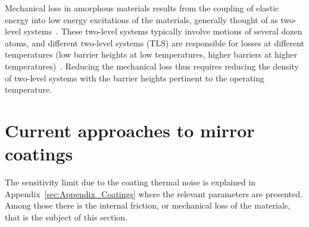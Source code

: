 Mechanical loss in amorphous materials results from the coupling of elastic energy into low energy excitations of the materials, generally thought of as two-level systems~\cite{braginsky1985systems,bommel1956dislocations}.
These two-level systems typically involve motions of several dozen atoms, and different two-level systems (TLS) are responsible for losses at different temperatures (low barrier heights at low temperatures, higher barriers at higher temperatures)~\cite{hamdan2014molecular,trinastic2016molecular}. Reducing the mechanical loss thus requires reducing the density of two-level systems with the barrier heights pertinent to the operating temperature. 


\section{Current approaches to  mirror coatings}

The sensitivity limit due to the coating thermal noise is explained  in Appendix~\ref{sec:Appendix_Coatings} where the relevant parameters are presented. Among those there is the internal friction, or mechanical loss of the materials, that is the subject of this section. 


